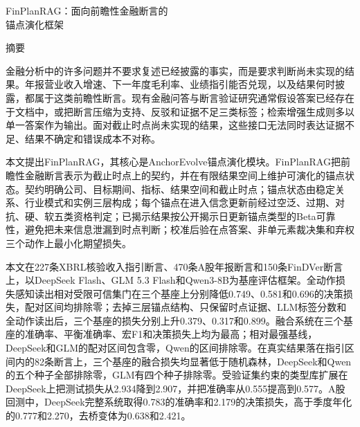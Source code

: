 \documentclass[12pt,openany]{ctexbook}
\newcommand{\method}{FinPlanRAG}
\begin{document}
\clearpage
{}
{}
\begin{center}
{\heiti \method：面向前瞻性金融断言的\\[0.2cm]
锚点演化框架\par}
\vspace{0.2cm}
{\heiti 摘\quad 要\par}
\end{center}
\vspace{0.2cm}
{\songti\sloppy
\setlength{\parindent}{0pt}
\setlength{\emergencystretch}{2em}
\hspace*{2em}金融分析中的许多问题并不要求复述已经披露的事实，而是要求判断尚未实现的结果。年报营业收入增速、下一年度毛利率、业绩指引能否兑现，以及结果何时披露，都属于这类前瞻性断言。现有金融问答与断言验证研究通常假设答案已经存在于文档中，或把断言压缩为支持、反驳和证据不足三类标签；检索增强生成则多以单一答案作为输出。面对截止时点尚未实现的结果，这些接口无法同时表达证据不足、结果不确定和错误成本不对称。\par
\hspace*{2em}本文提出FinPlanRAG，其核心是AnchorEvolve锚点演化模块。FinPlanRAG把前瞻性金融断言表示为截止时点上的契约，并在有限结果空间上维护可演化的锚点状态。契约明确公司、目标期间、指标、结果空间和截止时点；锚点状态由稳定关系、行业模式和实例三层构成；每个锚点在进入信念更新前经过空泛、过期、对抗、硬、软五类资格判定；已揭示结果按公开揭示日更新锚点类型的Beta可靠性，避免把未来信息泄漏到时点判断；校准后验在点答案、非单元素裁决集和弃权三个动作上最小化期望损失。\par
\hspace*{2em}本文在227条XBRL核验收入指引断言、470条A股年报断言和150条FinDVer断言上，以DeepSeek Flash、GLM 5.3 Flash和Qwen3-8B为基座评估框架。全动作损失感知读出相对受限可信集门在三个基座上分别降低0.749、0.581和0.696的决策损失，配对区间均排除零；去掉三层锚点结构、只保留时点证据、LLM标签分数和全动作读出后，三个基座的损失分别上升0.379、0.317和0.899。融合系统在三个基座的准确率、平衡准确率、宏F1和决策损失上均为最高；相对最强基线，DeepSeek和GLM的配对区间包含零，Qwen的区间排除零。在真实结果落在指引区间内的82条断言上，三个基座的融合损失均显著低于随机森林，DeepSeek和Qwen的五个种子全部排除零，GLM有四个种子排除零。受验证集约束的类型库扩展在DeepSeek上把测试损失从2.934降到2.907，并把准确率从0.555提高到0.577。A股回测中，DeepSeek完整系统取得0.783的准确率和2.179的决策损失，高于季度年化的0.777和2.270，去桥变体为0.638和2.421。\par
}
\end{document}
